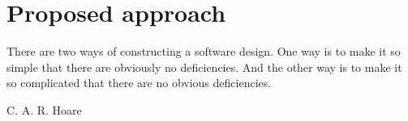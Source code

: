 \chapter{Proposed approach}
\label{capitolo4}
\thispagestyle{empty}

\epigraph{There are two ways of constructing a software design.  One way is to make it so simple that there are obviously no deficiencies. And the other way is to make it so complicated that there are no obvious deficiencies.}{C. A. R. Hoare}

\noindent {}
